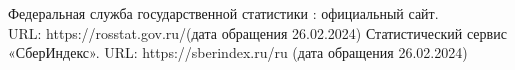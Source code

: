 \begin{thebibliography}{99}
Федеральная служба государственной статистики : официальный
сайт. \\ URL: https://rosstat.gov.ru/(дата обращения 26.02.2024)
Статистический сервис «СберИндекс». URL:
https://sberindex.ru/ru (дата обращения 26.02.2024)
\end{thebibliography}






%
